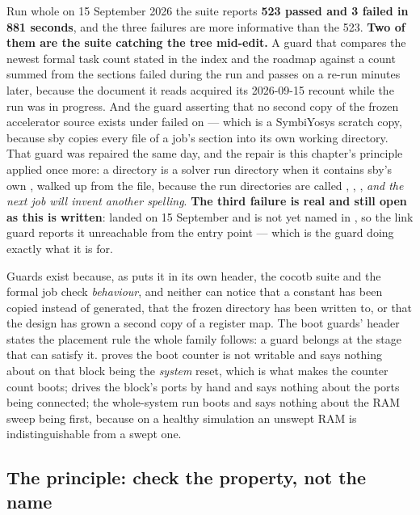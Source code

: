 Run whole on 15 September 2026 the suite reports \textbf{523 passed and
3 failed in 881 seconds}, and the three failures are more informative
than the 523. \textbf{Two of them are the suite catching the tree
mid-edit.} A guard that compares the newest formal task count stated in
the index and the roadmap against a count summed from the \code{[tasks]}
sections failed during the run and passes on a re-run minutes later,
because the document it reads acquired its 2026-09-15 recount while the
run was in progress. And the guard asserting that no second copy of the
frozen accelerator source exists under  failed on
 --- which is a
SymbiYosys scratch copy, because sby copies every file of a job's
\code{[files]} section into its own working directory. That guard was
repaired the same day, and the repair is this chapter's principle
applied once more: a directory is a solver run directory when it
contains sby's own , walked up from the file, because
the run directories are called , ,
,  \emph{and the next job will
invent another spelling}. \textbf{The third failure is real and still
open as this is written}:  landed on 15 September and is not
yet named in , so the link guard reports it
unreachable from the entry point --- which is the guard doing exactly
what it is for.

Guards exist because, as  puts
it in its own header, the cocotb suite and the formal job check
\emph{behaviour}, and neither can notice that a constant has been copied
instead of generated, that the frozen directory has been written to, or
that the design has grown a second copy of a register map. The boot
guards' header states the placement rule the whole family follows: a
guard belongs at the stage that can satisfy it. 
proves the boot counter is not writable and says nothing about
 on that block being the \emph{system} reset, which is what
makes the counter count boots;  drives the
block's ports by hand and says nothing about the ports being connected;
the whole-system run boots and says nothing about the RAM sweep being
first, because on a healthy simulation an unswept RAM is
indistinguishable from a swept one.

\subsection{The principle: check the property, not the name}

